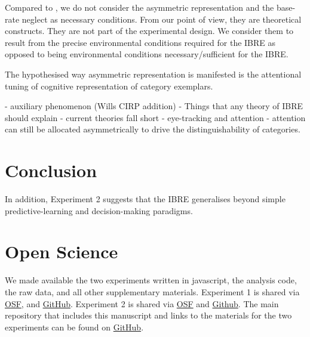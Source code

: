\documentclass[10pt,letterpaper]{article}
\begin{document}
Compared to , we do not consider the asymmetric representation and the base-rate neglect as necessary conditions.
From our point of view, they are theoretical constructs.
They are not part of the experimental design.
We consider them to result from the precise environmental conditions required for the IBRE as opposed to being environmental conditions necessary/sufficient for the IBRE.

The hypothesised way asymmetric representation is manifested is the attentional tuning of cognitive representation of category exemplars.

- auxiliary phenomenon (Wills CIRP addition)
- Things that any theory of IBRE should explain
- current theories fall short
- eye-tracking and attention
- attention can still be allocated asymmetrically to drive the distinguishability of categories.

\section{Conclusion}


In addition, Experiment 2 suggests that the IBRE generalises beyond simple predictive-learning \cite{kruschke1996base,don2021hearing} and decision-making \cite{johansen2007paradoxical} paradigms.


\section{Open Science}

We made available the two experiments written in javascript, the analysis code, the raw data, and all other supplementary materials.
Experiment 1 is shared via \href{https://osf.io/auwvt/?view_only=2dc8384074fa4bcf9f2e3937fdaee2b4}{OSF}, and \href{https://github.com/lenarddome/ply216-observational-ibre}{GitHub}.
Experiment 2 is shared via \href{https://osf.io/2tmc4/?view_only=489ebc888ef84a6b9b904072cfbe74df}{OSF} and \href{https://github.com/lenarddome/ply222-non-causal-ibre}{Github}.
The main repository that includes this manuscript and links to the materials for the two experiments can be found on \href{https://github.com/lenarddome/pu093-errorless-attentionless-ibre}{GitHub}.



\setlength{\bibleftmargin}{.125in}
\setlength{\bibindent}{-\bibleftmargin}


\end{document}
